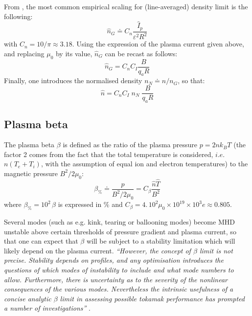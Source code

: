 From \cite[eq.(14.146)]{Freidberg2007}, the most common empirical scaling for (line-averaged) density limit is the following:
\begin{equation}
\boxed{\hat n_G \doteq C_n \frac{\hat I_p}{\varepsilon^2 R^2}  }
\label{eqn:greenwald_density}
\end{equation}
with $C_n = 10/\pi \approx 3.18$.
Using the expression of the plasma current given above, and replacing $\mu_0$ by its value, $\hat n_G$ can be recast as follows:
\begin{equation*}
\hat n_G = C_nC_I \frac{B}{q_aR}
\end{equation*}
Finally, one introduces the normalised density $n_N\doteq n/ n_G$, so that:
\begin{equation}
  \hat n = C_nC_I\; n_N\; \frac{B}{q_aR}
  \label{eq:n_nN}
\end{equation}

\subsection{Plasma beta}
The plasma beta $\beta$ is defined as the ratio of the plasma pressure $p=2nk_BT$ (the factor 2 comes from the fact that the total temperature is considered, $i.e.$ $n(T_e+T_i)$, with the assumption of equal ion and electron temperatures) to the magnetic pressure $B^2/2\mu_0$:
\begin{equation}
\boxed{\beta_\% \doteq \frac{p}{B^2/2\mu_0}
 = C_\beta \frac{\hat n \hat T}{B^2}}
\label{eqn:beta}
\end{equation}
where $\beta_\%=10^2\, \beta$ is expressed in $\%$ and $C_\beta = 4.\,10^2\mu_0\times 10^{19}\times 10^3 e \approx 0.805$.

Several modes (such as e.g. kink, tearing or ballooning modes) become MHD unstable above certain thresholds of pressure gradient and plasma current, so that one can expect that $\beta$ will be subject to a stability limitation which will likely depend on the plasma current. \emph{``However, the concept of $\beta$ limit is not precise. Stability depends on profiles, and any optimisation introduces the questions of which modes of instability to include and what mode numbers to allow. Furthermore, there is uncertainty as to the severity of the nonlinear consequences of the various modes. Nevertheless the intrinsic usefulness of a concise analytic $\beta$ limit in assessing possible tokamak performance has prompted a number of investigations''} \cite{Wesson2004}.


